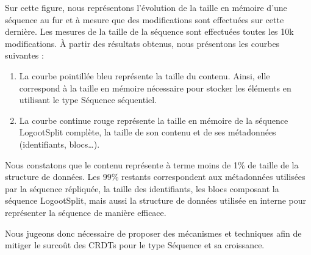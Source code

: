 Sur cette figure, nous représentons l'évolution de la taille en mémoire d'une séquence au fur et à mesure que des modifications sont effectuées sur cette dernière.
Les mesures de la taille de la séquence sont effectuées toutes les 10k modifications.
À partir des résultats obtenus, nous présentons les courbes suivantes :
\begin{enumerate}
  \item La courbe pointillée bleu représente la taille du contenu.
    Ainsi, elle correspond à la taille en mémoire nécessaire pour stocker les éléments en utilisant le type Séquence séquentiel.
  \item La courbe continue rouge représente la taille en mémoire de la séquence LogootSplit complète, \ie la taille de son contenu et de ses métadonnées (identifiants, blocs\dots).
\end{enumerate}

Nous constatons que le contenu représente à terme moins de 1\% de taille de la structure de données.
Les 99\% restants correspondent aux métadonnées utilisées par la séquence répliquée, \ie la taille des identifiants, les blocs composant la séquence LogootSplit, mais aussi la structure de données utilisée en interne pour représenter la séquence de manière efficace.

Nous jugeons donc nécessaire de proposer des mécanismes et techniques afin de mitiger le surcoût des \acp{CRDT} pour le type Séquence et sa croissance.

